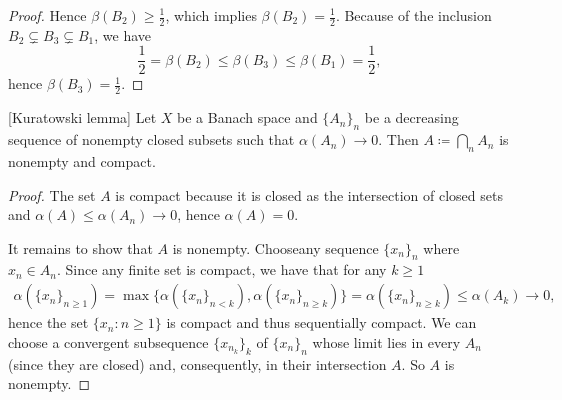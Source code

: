 \begin{proof}
  Hence \( \beta(B_2) \geq \frac 1 2 \), which implies \( \beta(B_2) = \frac 1 2 \). Because of the inclusion \( B_2 \subsetneq B_3 \subsetneq B_1 \), we have
  \begin{equation*}
    \frac 1 2 = \beta(B_2) \leq \beta(B_3) \leq \beta(B_1) = \frac 1 2,
  \end{equation*}
  hence \( \beta(B_3) = \frac 1 2 \).
\end{proof}

\begin{theorem}\label{thm:noncompact_kuratowski_lemma}[Kuratowski lemma]\cite[exercise 7.4]{Deimling1985}
  Let \( X \) be a Banach space and \( \{ A_n \}_n \) be a decreasing sequence of nonempty closed subsets such that \( \alpha(A_n) \to 0 \). Then \( A \coloneqq \bigcap_n A_n \) is nonempty and compact.
\end{theorem}
\begin{proof}
  The set \( A \) is compact because it is closed as the intersection of closed sets and \( \alpha(A) \leq \alpha(A_n) \to 0 \), hence \( \alpha(A) = 0 \).

  It remains to show that \( A \) is nonempty.
  Choose\AOC any sequence \( \{ x_n \}_n \) where \( x_n \in A_n \). Since any finite set is compact, we have that for any \( k \geq 1 \)
  \begin{align*}
    \alpha(\{ x_n \}_{n \geq 1})
    =
    \max\{ \alpha(\{ x_n \}_{n < k}), \alpha(\{ x_n \}_{n \geq k}) \}
    =
    \alpha(\{ x_n \}_{n \geq k})
    \leq
    \alpha(A_k) \to 0,
  \end{align*}
  hence the set \( \{ x_n \colon n \geq 1 \} \) is compact and thus sequentially compact. We can choose a convergent subsequence \( \{ x_{n_k} \}_k \) of \( \{ x_n \}_n \) whose limit lies in every \( A_n \) (since they are closed) and, consequently, in their intersection \( A \). So \( A \) is nonempty.
\end{proof}
